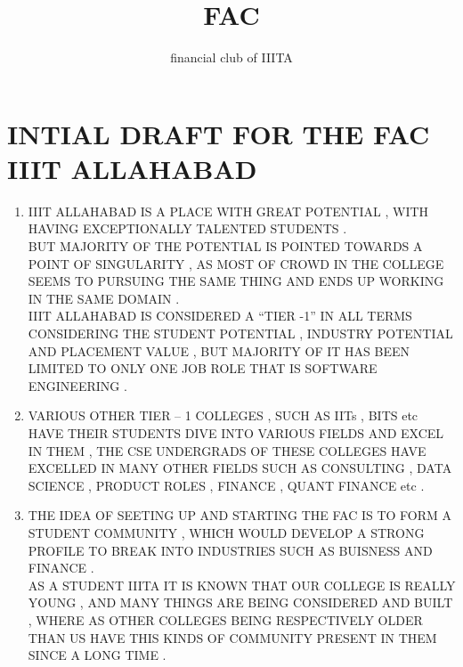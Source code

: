 \documentclass{article}
\title{FAC}
\author{financial club of IIITA}
\begin{document}
\maketitle


\section{INTIAL DRAFT FOR THE FAC IIIT ALLAHABAD }


\begin{enumerate}
\item  IIIT ALLAHABAD IS A PLACE WITH GREAT POTENTIAL , WITH HAVING EXCEPTIONALLY TALENTED STUDENTS . \\
 BUT MAJORITY OF THE POTENTIAL IS POINTED TOWARDS A  POINT OF SINGULARITY , AS MOST OF CROWD IN THE COLLEGE SEEMS TO PURSUING THE SAME THING AND ENDS UP WORKING IN THE SAME DOMAIN . \\
IIIT ALLAHABAD IS CONSIDERED A “TIER -1” IN ALL TERMS CONSIDERING THE STUDENT POTENTIAL , INDUSTRY POTENTIAL AND PLACEMENT VALUE , BUT MAJORITY OF IT HAS BEEN LIMITED TO ONLY ONE JOB ROLE THAT IS SOFTWARE ENGINEERING . 

\item  VARIOUS OTHER TIER – 1 COLLEGES , SUCH AS IITs  , BITS etc HAVE THEIR STUDENTS DIVE INTO VARIOUS FIELDS AND EXCEL IN THEM , THE CSE UNDERGRADS OF THESE COLLEGES HAVE EXCELLED IN MANY OTHER FIELDS SUCH AS CONSULTING , DATA SCIENCE , PRODUCT ROLES , FINANCE , QUANT FINANCE etc . 

\item THE IDEA OF SEETING UP AND STARTING THE FAC IS TO FORM A STUDENT COMMUNITY , WHICH WOULD DEVELOP A STRONG PROFILE TO BREAK INTO INDUSTRIES SUCH AS BUISNESS AND FINANCE . \\
AS A STUDENT IIITA IT IS KNOWN THAT OUR COLLEGE IS REALLY YOUNG , AND MANY THINGS ARE BEING CONSIDERED AND BUILT , WHERE AS OTHER COLLEGES BEING RESPECTIVELY OLDER THAN US HAVE THIS KINDS OF COMMUNITY PRESENT IN THEM SINCE A LONG TIME . 

\end{enumerate}
\end{document}
